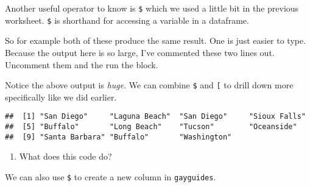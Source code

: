 \documentclass[
]{article}
\newenvironment{Shaded}{\begin{snugshade}}{\end{snugshade}}
\newcommand{\CommentTok}[1]{\textcolor[rgb]{0.56,0.35,0.01}{\textit{#1}}}
\newcommand{\ConstantTok}[1]{\textcolor[rgb]{0.00,0.00,0.00}{#1}}
\newcommand{\DecValTok}[1]{\textcolor[rgb]{0.00,0.00,0.81}{#1}}
\newcommand{\NormalTok}[1]{#1}
\newcommand{\OtherTok}[1]{\textcolor[rgb]{0.56,0.35,0.01}{#1}}
\newcommand{\SpecialCharTok}[1]{\textcolor[rgb]{0.00,0.00,0.00}{#1}}
\providecommand{\tightlist}{%
  \setlength{\itemsep}{0pt}\setlength{\parskip}{0pt}}
\begin{document}
\begin{quote}
\end{quote}

Another useful operator to know is \texttt{\$} which we used a little
bit in the previous worksheet. \texttt{\$} is shorthand for accessing a
variable in a dataframe.

So for example both of these produce the same result. One is just easier
to type. Because the output here is so large, I've commented these two
lines out. Uncomment them and the run the block.

\begin{Shaded}
\end{Shaded}

Notice the above output is \emph{huge}. We can combine \texttt{\$} and
\texttt{{[}} to drill down more specifically like we did earlier.

\begin{Shaded}
\end{Shaded}

\begin{verbatim}
##  [1] "San Diego"     "Laguna Beach"  "San Diego"     "Sioux Falls"  
##  [5] "Buffalo"       "Long Beach"    "Tucson"        "Oceanside"    
##  [9] "Santa Barbara" "Buffalo"       "Washington"
\end{verbatim}

\begin{enumerate}
\def\labelenumi{(\arabic{enumi})}
\setcounter{enumi}{10}
\tightlist
\item
  What does this code do?
\end{enumerate}

\begin{quote}
\end{quote}

We can also use \texttt{\$} to create a new column in
\texttt{gayguides}.

\begin{Shaded}
\end{Shaded}
\end{document}
